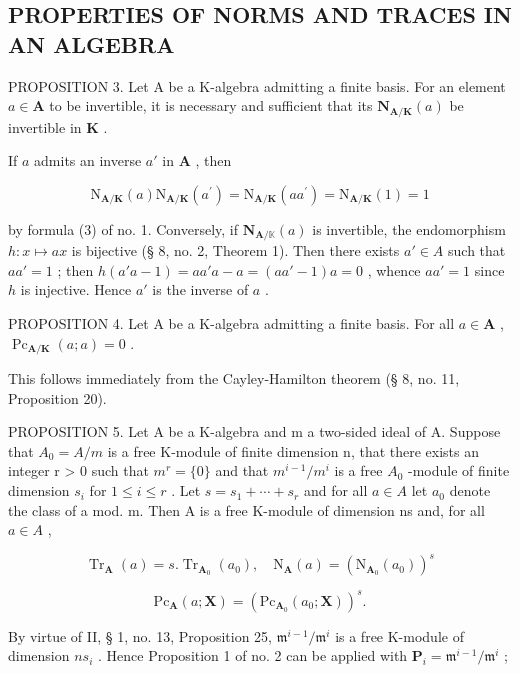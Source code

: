 \subsection{PROPERTIES OF NORMS AND TRACES IN AN ALGEBRA}

PROPOSITION 3. Let A be a K-algebra admitting a finite basis. For an element \(a \in \mathbf{A}\) to be invertible, it is necessary and sufficient that its \(\mathbf{N}_{\mathbf{A} / \mathbf{K}}(a)\) be invertible in \(\mathbf{K}\) .

If \(a\) admits an inverse \(a'\) in \(\mathbf{A}\) , then

\[
\mathrm{N} _ {\mathbf {A} / \mathbf {K}} (a) \mathrm{N} _ {\mathbf {A} / \mathbf {K}} (a ^ {\prime}) = \mathrm{N} _ {\mathbf {A} / \mathbf {K}} (a a ^ {\prime}) = \mathrm{N} _ {\mathbf {A} / \mathbf {K}} (1) = 1
\]

by formula (3) of no. 1. Conversely, if \(\mathbf{N}_{\mathbf{A} / \mathbb{K}}(a)\) is invertible, the endomorphism \(h: x \mapsto ax\) is bijective (§ 8, no. 2, Theorem 1). Then there exists \(a' \in A\) such that \(aa' = 1\) ; then \(h(a'a - 1) = aa'a - a = (aa' - 1)a = 0\) , whence \(aa' = 1\) since \(h\) is injective. Hence \(a'\) is the inverse of \(a\) .

PROPOSITION 4. Let A be a K-algebra admitting a finite basis. For all \(a \in \mathbf{A}\) , \(\operatorname{Pc}_{\mathbf{A} / \mathbf{K}}(a; a) = 0\) .

This follows immediately from the Cayley-Hamilton theorem (§ 8, no. 11, Proposition 20).

PROPOSITION 5. Let A be a K-algebra and m a two-sided ideal of A. Suppose that \(A_{0} = A/m\) is a free K-module of finite dimension n, that there exists an integer r \textgreater{} 0 such that \(m^{r} = \{0\}\) and that \(m^{i-1}/m^{i}\) is a free \(A_{0}\) -module of finite dimension \(s_{i}\) for \(1 \leqslant i \leqslant r\) . Let \(s = s_{1} + \cdots + s_{r}\) and for all \(a \in A\) let \(a_{0}\) denote the class of a mod. m. Then A is a free K-module of dimension ns and, for all \(a \in A\) ,

\[
\operatorname{Tr} _ {\mathbf {A}} (a) = s. \operatorname{Tr} _ {\mathbf {A} _ {0}} (a _ {0}), \quad \mathrm{N} _ {\mathbf {A}} (a) = (\mathrm{N} _ {\mathbf {A} _ {0}} (a _ {0})) ^ {s}\tag{23}
\]

\[
\mathrm{Pc} _ {\mathbf {A}} (a; \mathbf {X}) = (\mathrm{Pc} _ {\mathbf {A} _ {0}} (a _ {0}; \mathbf {X})) ^ {s}.
\]

By virtue of II, § 1, no. 13, Proposition 25, \(\mathfrak{m}^{i - 1} / \mathfrak{m}^{i}\) is a free K-module of dimension \(ns_i\) . Hence Proposition 1 of no. 2 can be applied with \(\mathbf{P}_i = \mathfrak{m}^{i - 1} / \mathfrak{m}^{i}\) ;


